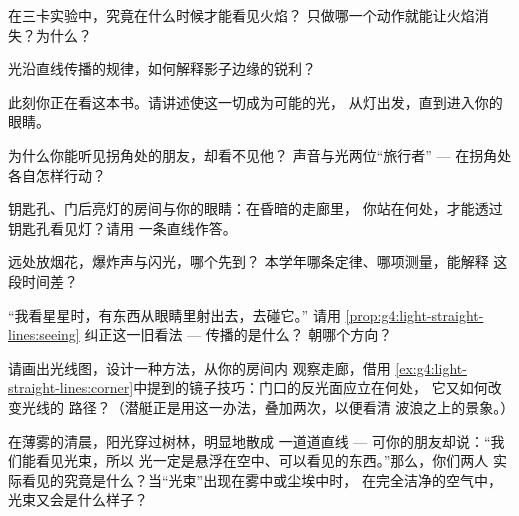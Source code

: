 \begin{exercise}[$\star$]\label{exo:g4:light-straight-lines:3}
在三卡实验中，究竟在什么时候才能看见火焰？
只做哪一个动作就能让火焰消失？为什么？
\end{exercise}

\begin{exercise}[$\star$]\label{exo:g4:light-straight-lines:4}
光沿直线传播的规律，如何解释影子边缘的锐利？
\end{exercise}

\begin{exercise}[$\star$]\label{exo:g4:light-straight-lines:5}
此刻你正在看这本书。请讲述使这一切成为可能的光，
从灯出发，直到进入你的眼睛。
\end{exercise}

\begin{exercise}[$\star$]\label{exo:g4:light-straight-lines:6}
为什么你能听见拐角处的朋友，却看不见他？
声音与光两位“旅行者” --- 在拐角处各自怎样行动？
\end{exercise}

\begin{exercise}[$\star$]\label{exo:g4:light-straight-lines:7}
钥匙孔、门后亮灯的房间与你的眼睛：在昏暗的走廊里，
你站在何处，才能透过钥匙孔看见灯？请用
一条直线作答。
\end{exercise}

\begin{exercise}[$\star$]\label{exo:g4:light-straight-lines:8}
远处放烟花，爆炸声与闪光，哪个先到？
本学年哪条定律、哪项测量，能解释
这段时间差？
\end{exercise}

\begin{exercise}[$\star$]\label{exo:g4:light-straight-lines:9}
“我看星星时，有东西从眼睛里射出去，去碰它。”
请用
\cref{prop:g4:light-straight-lines:seeing} 纠正这一旧看法 --- 传播的是什么？
朝哪个方向？
\end{exercise}

\begin{exercise}[$\star\star$]\label{exo:g4:light-straight-lines:10}
请画出光线图，设计一种方法，从你的房间内
观察走廊，借用
\cref{ex:g4:light-straight-lines:corner}中提到的镜子技巧：门口的反光面应立在何处，
它又如何改变光线的
路径？（潜艇正是用这一办法，叠加两次，以便看清
波浪之上的景象。）
\end{exercise}

\begin{exercise}[$\star\star$]\label{exo:g4:light-straight-lines:11}
在薄雾的清晨，阳光穿过树林，明显地散成
一道道直线 --- 可你的朋友却说：“我们能看见光束，所以
光一定是悬浮在空中、可以看见的东西。”那么，你们两人
实际看见的究竟是什么？当“光束”出现在雾中或尘埃中时，
在完全洁净的空气中，光束又会是什么样子？
\end{exercise}
